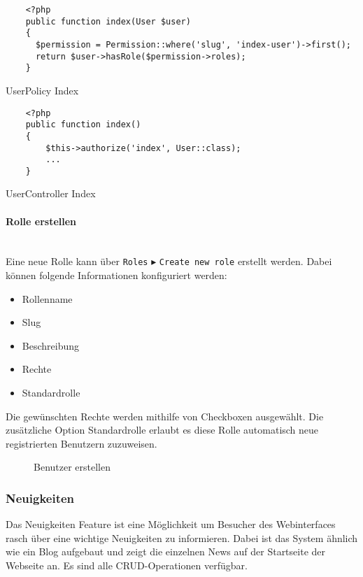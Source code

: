 \begin{listing}[H]
  \begin{verbatim}
    <?php
    public function index(User $user)
    {
      $permission = Permission::where('slug', 'index-user')->first();
      return $user->hasRole($permission->roles);
    }
  \end{verbatim}
  \caption{UserPolicy Index}
\end{listing}

\begin{listing}[H]
  \begin{verbatim}
    <?php
    public function index()
    {
        $this->authorize('index', User::class);
        ...
    }
  \end{verbatim}
  \caption{UserController Index}
\end{listing}

\paragraph{Rolle erstellen}\mbox{}\\
Eine neue Rolle kann über \verb|Roles| $\blacktriangleright$ 
\verb|Create new role| erstellt werden. Dabei können
folgende Informationen konfiguriert werden:

\begin{itemize}
  \item Rollenname
  \item Slug
  \item Beschreibung
  \item Rechte
  \item Standardrolle
\end{itemize}

Die gewünschten Rechte werden mithilfe von Checkboxen ausgewählt. Die
zusätzliche Option Standardrolle erlaubt es diese Rolle automatisch neue
registrierten Benutzern zuzuweisen.

\begin{figure}[H]
  \centering
  \caption{Benutzer erstellen}
\end{figure}


\subsubsection{Neuigkeiten}
Das Neuigkeiten Feature ist eine Möglichkeit um Besucher des Webinterfaces
rasch über eine wichtige Neuigkeiten zu informieren. Dabei ist das System ähnlich
wie ein Blog aufgebaut und zeigt die einzelnen News auf der Startseite der
Webseite an. Es sind alle CRUD-Operationen verfügbar.


